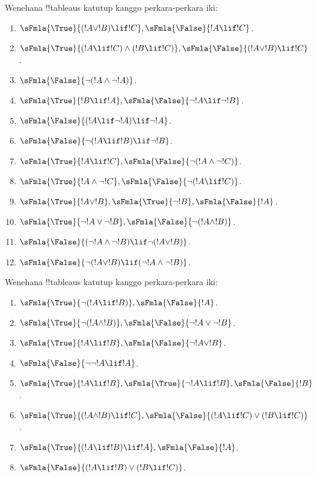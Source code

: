 \documentclass[../../../include/open-logic-section]{subfiles}
\begin{document}
\begin{prob}
Wenehana !!{tableau}s katutup kanggo perkara-perkara iki:
\begin{enumerate}
\item $\sFmla{\True}{(!A \lor !B) \lif !C}, \sFmla{\False}{!A \lif !C}$.
\item $\sFmla{\True}{(!A \lif !C) \land (!B \lif !C)}, \sFmla{\False}{(!A \lor !B) \lif !C}$.
\item $\sFmla{\False}{\lnot(!A \land \lnot !A)}$.
\item $\sFmla{\True}{!B \lif !A}, \sFmla{\False}{\lnot !A \lif \lnot !B}$.
\item $\sFmla{\False}{(!A \lif \lnot !A) \lif \lnot !A}$.
\item $\sFmla{\False}{\lnot(!A \lif !B) \lif \lnot !B}$.
\item $\sFmla{\True}{!A \lif !C}, \sFmla{\False}{\lnot (!A \land \lnot !C)}$.
\item $\sFmla{\True}{!A \land \lnot !C}, \sFmla{\False}{\lnot (!A \lif !C)}$.
\item $\sFmla{\True}{!A \lor !B}, \sFmla{\True}{\lnot !B}, \sFmla{\False}{!A}$.
\item $\sFmla{\True}{\lnot !A \lor \lnot !B}, \sFmla{\False}{\lnot(!A \land !B)}$.
\item $\sFmla{\False}{(\lnot !A \land \lnot !B) \lif\lnot(!A \lor !B)}$.
\item $\sFmla{\False}{\lnot(!A \lor !B) \lif (\lnot !A \land \lnot !B)}$.
\end{enumerate}
\end{prob}

\begin{prob}
Wenehana !!{tableau}s katutup kanggo perkara-perkara iki:
\begin{enumerate}
\item $\sFmla{\True}{\lnot(!A \lif !B)}, \sFmla{\False}{!A}$.
\item $\sFmla{\True}{\lnot(!A \land !B)}, \sFmla{\False}{\lnot !A \lor \lnot !B}$.
\item $\sFmla{\True}{!A \lif !B}, \sFmla{\False}{\lnot !A \lor !B}$.
\item $\sFmla{\False}{\lnot \lnot !A \lif !A}$.
\item $\sFmla{\True}{!A \lif !B}, \sFmla{\True}{\lnot !A \lif !B}, \sFmla{\False}{!B}$.
\item $\sFmla{\True}{(!A \land !B) \lif !C}, \sFmla{\False}{(!A \lif !C) \lor (!B \lif !C)}$.
\item $\sFmla{\True}{(!A \lif !B) \lif !A}, \sFmla{\False}{!A}$.
\item $\sFmla{\False}{(!A \lif !B) \lor (!B \lif !C)}$.
\end{enumerate}
\end{prob}
\end{document}
